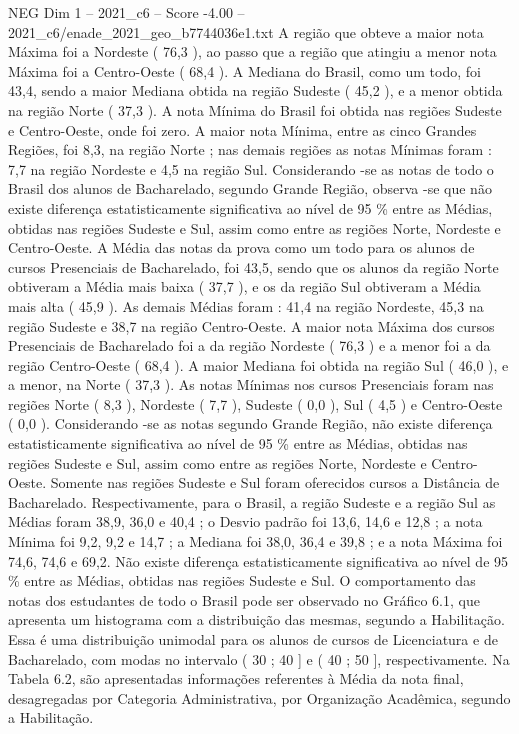 \begin{textsample}{NEG Dim 1 – 2021\_c6 – Score -4.00 – 2021\_c6/enade\_2021\_geo\_b7744036e1.txt}
A região que obteve a maior nota Máxima foi a Nordeste ( 76,3 ), ao passo que a região que atingiu a menor nota Máxima foi a Centro-Oeste ( 68,4 ).
A Mediana do Brasil, como um todo, foi 43,4, sendo a maior Mediana obtida na região Sudeste ( 45,2 ), e a menor obtida na região Norte ( 37,3 ).
A nota Mínima do Brasil foi obtida nas regiões Sudeste e Centro-Oeste, onde foi zero.
A maior nota Mínima, entre as cinco Grandes Regiões, foi 8,3, na região Norte ; nas demais regiões as notas Mínimas foram : 7,7 na região Nordeste e 4,5 na região Sul.
Considerando -se as notas de todo o Brasil dos alunos de Bacharelado, segundo Grande Região, observa -se que não existe diferença estatisticamente significativa ao nível de 95 \% entre as Médias, obtidas nas regiões Sudeste e Sul, assim como entre as regiões Norte, Nordeste e Centro-Oeste.
A Média das notas da prova como um todo para os alunos de cursos Presenciais de Bacharelado, foi 43,5, sendo que os alunos da região Norte obtiveram a Média mais baixa ( 37,7 ), e os da região Sul obtiveram a Média mais alta ( 45,9 ).
As demais Médias foram : 41,4 na região Nordeste, 45,3 na região Sudeste e 38,7 na região Centro-Oeste.
A maior nota Máxima dos cursos Presenciais de Bacharelado foi a da região Nordeste ( 76,3 ) e a menor foi a da região Centro-Oeste ( 68,4 ).
A maior Mediana foi obtida na região Sul ( 46,0 ), e a menor, na Norte ( 37,3 ).
As notas Mínimas nos cursos Presenciais foram nas regiões Norte ( 8,3 ), Nordeste ( 7,7 ), Sudeste ( 0,0 ), Sul ( 4,5 ) e Centro-Oeste ( 0,0 ).
Considerando -se as notas segundo Grande Região, não existe diferença estatisticamente significativa ao nível de 95 \% entre as Médias, obtidas nas regiões Sudeste e Sul, assim como entre as regiões Norte, Nordeste e Centro-Oeste.
Somente nas regiões Sudeste e Sul foram oferecidos cursos a Distância de Bacharelado.
Respectivamente, para o Brasil, a região Sudeste e a região Sul as Médias foram 38,9, 36,0 e 40,4 ; o Desvio padrão foi 13,6, 14,6 e 12,8 ; a nota Mínima foi 9,2, 9,2 e 14,7 ; a Mediana foi 38,0, 36,4 e 39,8 ; e a nota Máxima foi 74,6, 74,6 e 69,2.
Não existe diferença estatisticamente significativa ao nível de 95 \% entre as Médias, obtidas nas regiões Sudeste e Sul.
O comportamento das notas dos estudantes de todo o Brasil pode ser observado no Gráfico 6.1, que apresenta um histograma com a distribuição das mesmas, segundo a Habilitação.
Essa é uma distribuição unimodal para os alunos de cursos de Licenciatura e de Bacharelado, com modas no intervalo ( 30 ; 40 ] e ( 40 ; 50 ], respectivamente.
Na Tabela 6.2, são apresentadas informações referentes à Média da nota final, desagregadas por Categoria Administrativa, por Organização Acadêmica, segundo a Habilitação.

\end{textsample}
